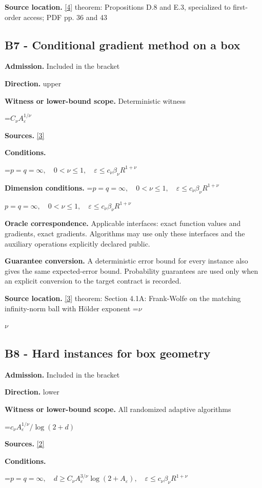 \documentclass[10pt,a4paper]{article}
\newcommand{\AtlasMath}[1]{\par\begingroup\centering\setbox0=\hbox{$\displaystyle #1$}\ifdim\wd0>1.4\linewidth\typeout{ATLAS WIDE FORMULA: \the\wd0}\fi\ifdim\wd0>\linewidth\resizebox{\linewidth}{!}{\box0}\else\box0\fi\par\endgroup}
\newcommand{\AtlasInlineMath}[1]{\begingroup\setbox0=\hbox{$#1$}\ifdim\wd0>.4\linewidth\endgroup\AtlasMath{#1}\else\endgroup$#1$\fi}
\begin{document}
\textbf{Source location.} \href{https://arxiv.org/pdf/2609.32910}{[4]} theorem: Propositions D.8 and E.3, specialized to first-order access; PDF pp. 36 and 43

\subsection{B7 - Conditional gradient method on a box}
\textbf{Admission.} Included in the bracket

\textbf{Direction.} upper

\textbf{Witness or lower-bound scope.} Deterministic witness

\AtlasMath{C_\nu A_\varepsilon^{1/\nu}}
\textbf{Sources.} \href{https://arxiv.org/pdf/1307.5001}{[3]}

\textbf{Conditions.} 
\AtlasMath{p=q=\infty,\quad0<\nu\le1,\quad\varepsilon\le c_\nu\beta_\nu R^{1+\nu}}


\textbf{Dimension conditions.} \AtlasInlineMath{p=q=\infty,\quad0<\nu\le1,\quad\varepsilon\le c_\nu\beta_\nu R^{1+\nu}}

\textbf{Oracle correspondence.} Applicable interfaces: exact function values and gradients, exact gradients. Algorithms may use only these interfaces and the auxiliary operations explicitly declared public.

\textbf{Guarantee conversion.} A deterministic error bound for every instance also gives the same expected-error bound. Probability guarantees are used only when an explicit conversion to the target contract is recorded.

\textbf{Source location.} \href{https://arxiv.org/pdf/1307.5001}{[3]} theorem: Section 4.1A: Frank-Wolfe on the matching infinity-norm ball with Hölder exponent \AtlasInlineMath{\nu}

\subsection{B8 - Hard instances for box geometry}
\textbf{Admission.} Included in the bracket

\textbf{Direction.} lower

\textbf{Witness or lower-bound scope.} All randomized adaptive algorithms

\AtlasMath{c_\nu A_\varepsilon^{1/\nu}/\log(2+d)}
\textbf{Sources.} \href{https://proceedings.mlr.press/v99/diakonikolas19c/diakonikolas19c.pdf}{[2]}

\textbf{Conditions.} 
\AtlasMath{p=q=\infty,\quad d\ge C_\nu A_\varepsilon^{3/\nu}\log(2+A_\varepsilon),\quad\varepsilon\le c_\nu\beta_\nu R^{1+\nu}}
\end{document}
